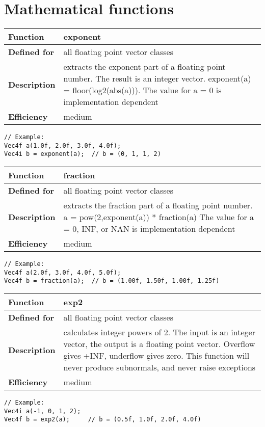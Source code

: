 \documentclass[vcl_manual.tex]{subfiles}
\begin{document}
\chapter{Mathematical functions}\label{chap:MathematicalFunctions}
\flushleft

\begin{tabular}{|p{25mm}|p{100mm}|}
\hline
\bfseries Function & exponent \\ \hline
\bfseries Defined for & all floating point vector classes \\ \hline
\bfseries Description & extracts the exponent part of a floating point number. The result is an integer vector.\newline 
exponent(a) = floor(log2(abs(a))).\newline
The value for a = 0 is implementation dependent \\ \hline
 \bfseries Efficiency & medium \\ \hline
\end{tabular}
\begin{lstlisting}[frame=none]
// Example:
Vec4f a(1.0f, 2.0f, 3.0f, 4.0f);
Vec4i b = exponent(a);  // b = (0, 1, 1, 2)
\end{lstlisting}


\begin{tabular}{|p{25mm}|p{100mm}|}
\hline
\bfseries Function & fraction \\ \hline
\bfseries Defined for & all floating point vector classes \\ \hline
\bfseries Description & extracts the fraction part of a floating point number.\newline
a = pow(2,exponent(a)) * fraction(a) \newline
The value for a = 0, INF, or NAN is implementation dependent \\ \hline
\bfseries Efficiency & medium \\ \hline
\end{tabular}
\begin{lstlisting}[frame=none]
// Example:
Vec4f a(2.0f, 3.0f, 4.0f, 5.0f);
Vec4f b = fraction(a);  // b = (1.00f, 1.50f, 1.00f, 1.25f)
\end{lstlisting}


\begin{tabular}{|p{25mm}|p{100mm}|}
\hline
\bfseries Function & exp2 \\ \hline
\bfseries Defined for & all floating point vector classes \\ \hline
\bfseries Description & calculates integer powers of 2. The input is an integer vector, the output is a floating point vector. Overflow gives +INF, underflow gives zero. This function will never produce subnormals, and never raise exceptions \\ \hline
\bfseries Efficiency & medium \\ \hline
\end{tabular}
\begin{lstlisting}[frame=none]
// Example:
Vec4i a(-1, 0, 1, 2);
Vec4f b = exp2(a);     // b = (0.5f, 1.0f, 2.0f, 4.0f)
\end{lstlisting}
\end{document}
